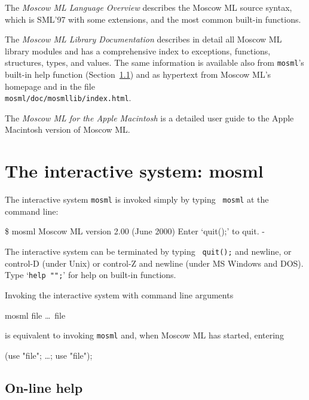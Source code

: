 \documentclass[fleqn,a4paper]{article}
\begin{document}
The {\em Moscow ML Language Overview\/}
\cite{MoscowML:2000:MoscowMLLanguage} describes the Moscow ML source
syntax, which is SML'97 with some extensions, and the most common
built-in functions.

The \emph{Moscow ML Library Documentation}
\cite{MoscowML:2000:MoscowMLLibrary} describes in detail all Moscow ML
library modules and has a comprehensive index to exceptions,
functions, structures, types, and values.  The same information is
available also from {\tt mosml}'s built-in help function
(Section~\ref{sec-mosml-help}) and as hypertext from Moscow ML's
homepage and in the file\\ \texttt{mosml/doc/mosmllib/index.html}.

The \emph{Moscow ML for the Apple Macintosh}
\cite{Currie:1999:MoscowMLMac} is a detailed user guide to the Apple
Macintosh version of Moscow ML\@.

\newpage

\section{The interactive system: mosml}
\label{sec-interactive-system}

The interactive system {\tt mosml} is invoked simply by typing {\tt
  mosml} at the command line:

\begin{program}
\$ mosml
Moscow ML version 2.00 (June 2000)
Enter `quit();' to quit.
- 
\end{program}

\noindent The interactive system can be terminated by typing {\tt
  quit();} and newline, or control-D (under Unix) or control-Z and
newline (under MS Windows and DOS).  Type `{\tt help "";}' for help on
built-in functions.

Invoking the interactive system with command line arguments

\begin{program}
mosml file \ldots\ file
\end{program}

\noindent is equivalent to invoking {\tt mosml} and, when Moscow ML
has started, entering

\begin{program}
(use "file"; \ldots; use "file");  
\end{program}


\subsection{On-line help}
\label{sec-mosml-help}
\end{document}
